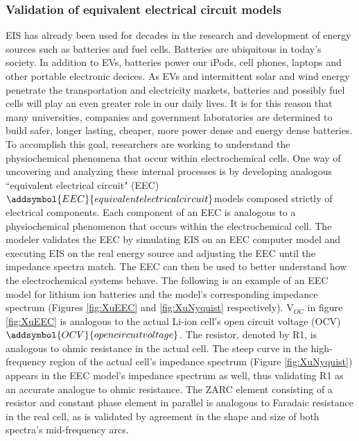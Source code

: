 			\subsubsection{Validation of equivalent electrical circuit models}
				EIS has already been used for decades in the research and development of energy sources such as batteries and fuel cells. Batteries are ubiquitous in today's society. In addition to EVs, batteries power our iPods, cell phones, laptops and other portable electronic decices. As EVs and  intermittent solar and wind energy penetrate the transportation and electricity markets, batteries and possibly fuel cells will play an even greater role in our daily lives. It is for this reason that many universities, companies and government laboratories are determined to build safer, longer lasting, cheaper, more power dense and energy dense batteries. To accomplish this goal, researchers  are working to understand the physiochemical phenomena that occur within electrochemical cells. One way of uncovering and analyzing these internal processes is by developing analogous ``equivalent electrical circuit" (EEC) $\addsymbol{EEC}{equivalent electrical circuit}$models composed strictly of electrical components. Each component of an EEC is analogous to a physiochemical phenomenon that occurs within the electrochemical cell. The modeler validates the EEC by simulating EIS on an EEC computer model and executing EIS on the real energy source and adjusting the EEC until the impedance spectra match. The EEC can then be used to better understand how the electrochemical systems behave. %
The following is an example of an EEC model for lithium ion batteries and the model's corresponding impedance spectrum (Figures \ref{fig:XuEEC} and \ref{fig:XuNyquist} respectively)\cite{JunXu2013}. 
V$_{OC}$ in figure \ref{fig:XuEEC} is analogous to the actual Li-ion cell's open circuit voltage (OCV) $\addsymbol{OCV}{open circuit voltage}$. The resistor, denoted by R1, is analogous to ohmic resistance in the actual cell. The steep curve in the high-frequency region of the actual cell's impedance spectrum (Figure \ref{fig:XuNyquist}) appears in the EEC model's impedance spectrum as well, thus validating R1 as an accurate analogue to ohmic resistance.  The ZARC element consisting of a resistor and constant phase element in parallel is analogous to Faradaic resistance in the real cell, as is validated by agreement in the shape and size of both spectra's mid-frequency arcs.
